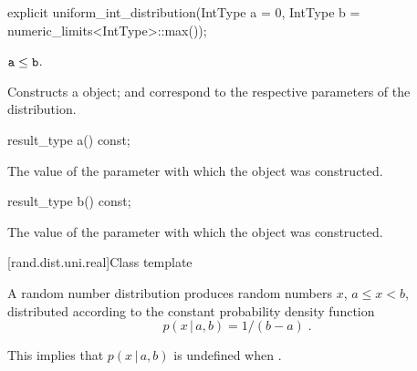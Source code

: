 %
\begin{itemdecl}
explicit uniform_int_distribution(IntType a = 0, IntType b = numeric_limits<IntType>::max());
\end{itemdecl}

\begin{itemdescr}
\pnum\requires
 $ \texttt{a} \leq \texttt{b} $.

\pnum\effects Constructs a  object;
  and 
 correspond to the respective parameters of the distribution.
\end{itemdescr}

%
\begin{itemdecl}
result_type a() const;
\end{itemdecl}

\begin{itemdescr}
\pnum\returns The value of the  parameter
 with which the object was constructed.
\end{itemdescr}

%
\begin{itemdecl}
result_type b() const;
\end{itemdecl}

\begin{itemdescr}
\pnum\returns The value of the  parameter
 with which the object was constructed.
\end{itemdescr}


[rand.dist.uni.real]{Class template }%
%
%

\pnum
A  random number distribution
produces random numbers $x$,
$ a \leq x < b $,
distributed according to
the constant probability density function%
%
%
\[%
 p(x\,|\,a,b) = 1 / (b - a)
\; \mbox{.}
\]
\begin{note}
This implies that $p(x\,|\,a,b)$ is undefined when .
\end{note}

